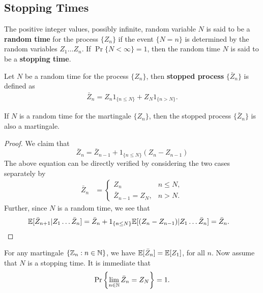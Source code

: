 \documentclass[a4paper,10pt,english]{article}
\begin{document}
\subsection{Stopping Times}
\begin{defn}The positive integer values, possibly infinite, random variable $N$ is said to be a \textbf{random time} for the process $\{Z_n\}$ if the event $\{N=n\}$ is determined by the random variables $Z_1 \hdots Z_n$. If $\Pr\{N < \infty\}=1$, then the random time $N$ is said to be a \textbf{stopping time}.  
\end{defn}
\begin{defn}
Let $N$ be a random time for the process $\{Z_n\}$, then \textbf{stopped process} $\{\bar{Z}_n\}$ is defined as 
\begin{align*}
\bar{Z}_n = Z_n1_{\{n \leq N\}} + Z_N1_{\{n > N\}}.
\end{align*}
\end{defn}
\begin{prop}
If $N$ is a random time for the martingale $\{Z_n\}$, then the stopped process $\{\bar{Z}_n\}$ is also a martingale.
\end{prop}
\begin{proof}
We claim that 
\begin{equation*}
\bar{Z}_n= \bar{Z}_{n-1}+1_{\{n \leq N\}}(Z_n-Z_{n-1})
\end{equation*}
The above equation can be directly verified by considering the two cases separately by
\begin{align*}
\bar{Z}_n &= 
\begin{cases}
Z_n & n \leq N,\\
\bar{Z}_{n-1}=Z_N, & n > N.
\end{cases}
\end{align*}
Further, since $N$ is a random time, we see that 
\begin{align*}
\E[\bar{Z}_{n+1}|Z_1 \hdots \bar{Z}_n] %
&=\bar{Z}_{n}+1_{\{n \leq N\}} \E[(Z_n-Z_{n-1})|Z_1 \hdots \bar{Z}_n] =\bar{Z}_{n}.
\end{align*}
\end{proof}
\begin{rem}
For any martingale $\{\mathbb{Z}_n: n \in \mathbb{N}\}$, we have $\mathbb{E}[\bar{Z}_{n}]=\mathbb{E}[Z_1]$, for all $n$.  Now assume that $N$ is a stopping time. It is immediate that 
\begin{equation*}
\Pr\left\{\lim_{n\in \mathbb{N}}\bar{Z}_n = Z_N\right\} = 1.
\end{equation*}
\end{rem}
\end{document}
